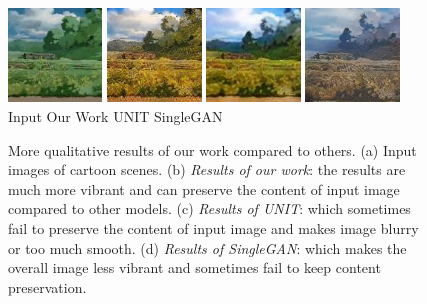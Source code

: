 \documentclass[runningheads]{llncs}
\begin{document}
\begin{figure}[!htb]
\subfigure
{\includegraphics[width=25mm]{pic/in_3.jpg}}
\subfigure
{\includegraphics[width=25mm]{pic/our_3.png}}
\subfigure
{\includegraphics[width=25mm]{pic/unit_3.jpg}}
\subfigure
{\includegraphics[width=25mm]{pic/sgan_3.jpg}}\\
\hspace{0.08in}
\subfigure
{Input}
\hspace{0.5in}
\subfigure
{Our Work}
\hspace{0.5in}
\subfigure
{UNIT}
\hspace{0.4in}
\subfigure
{SingleGAN}
\caption{More qualitative results of our work compared to others. (a) Input images of cartoon scenes. (b) \textit{Results of our work}: the results are much more vibrant and can preserve the content of input image compared to other models. (c) \textit{Results of UNIT}\cite{DBLP:journals/corr/LiuBK17}: which sometimes fail to preserve the content of input image and makes image blurry or too much smooth. (d) \textit{Results of SingleGAN}\cite{DBLP:journals/corr/abs-1810-04991}: which makes the overall image less vibrant and sometimes fail to keep content preservation.}
\label{fig:more results}
\end{figure}
\end{document}
